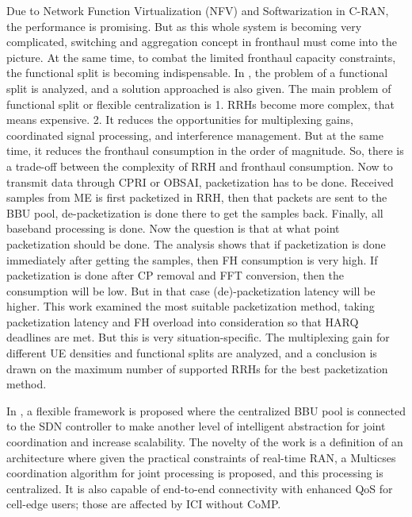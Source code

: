 \begin{multicols}{2}
Due to Network Function Virtualization (NFV) and Softwarization in C-RAN, the performance is promising. But as this whole system is becoming very complicated, switching and aggregation concept in fronthaul must come into the picture. At the same time, to combat the limited fronthaul capacity constraints, the functional split is becoming indispensable. In \cite{art3-key29}, the problem of a functional split is analyzed, and a solution approached is also given. The main problem of functional split or flexible centralization is 1. RRHs become more complex, that means expensive. 2. It reduces the opportunities for multiplexing gains, coordinated signal processing, and interference management. But at the same time, it reduces the fronthaul consumption in the order of magnitude. So, there is a trade-off between the complexity of RRH and fronthaul consumption. Now to transmit data through CPRI or OBSAI, packetization has to be done. Received samples from ME is first packetized in RRH, then that packets are sent to the BBU pool, de-packetization is done there to get the samples back. Finally, all baseband processing is done. Now the question is that at what point packetization should be done. The analysis shows that if packetization is done immediately after getting the samples, then FH consumption is very high. If packetization is done after CP removal and FFT conversion, then the consumption will be low. But in that case (de)-packetization latency will be higher. This work examined the most suitable packetization method, taking packetization latency and FH overload into consideration so that HARQ deadlines are met. But this is very situation-specific. The multiplexing gain for different UE densities and functional splits are analyzed, and a conclusion is drawn on the maximum number of supported RRHs for the best packetization method.

In \cite{art3-key30}, a flexible framework is proposed where the centralized BBU pool is connected to the SDN controller to make another level of intelligent abstraction for joint coordination and increase scalability. The novelty of the work is a definition of an architecture where given the practical constraints of real-time RAN, a Multicses coordination algorithm for joint processing is proposed, and this processing is centralized. It is also capable of end-to-end connectivity with enhanced QoS for cell-edge users; those are affected by ICI without CoMP.


\end{multicols}
